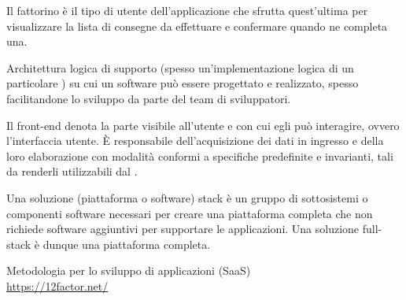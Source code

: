 Il fattorino è il tipo di utente dell’applicazione che sfrutta quest’ultima per visualizzare la lista di consegne da effettuare e confermare quando ne completa una.

Architettura logica di supporto (spesso un'implementazione logica di un particolare ) su cui un software può essere progettato e realizzato, spesso facilitandone lo sviluppo da parte del team di sviluppatori.

Il front-end denota la parte visibile all’utente e con cui egli può interagire, ovvero l’interfaccia utente. \`{E} responsabile dell’acquisizione dei dati in ingresso e della loro elaborazione con modalità conformi a specifiche predefinite e invarianti, tali da renderli utilizzabili dal .

Una soluzione (piattaforma o software) stack è un gruppo di sottosistemi o componenti software necessari per creare una piattaforma completa che non richiede software aggiuntivi per supportare le applicazioni. Una soluzione full-stack è dunque una piattaforma completa.	

Metodologia per lo sviluppo di applicazioni  (SaaS)\\
\url{https://12factor.net/}
\clearpage